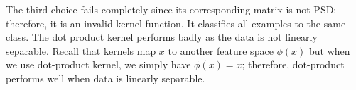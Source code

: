 \begin{answer}
	The third choice fails completely since its corresponding matrix is not PSD; therefore, it is an invalid kernel function.
	It classifies all examples to the same class.
The dot product kernel performs badly as the data is not linearly separable.
Recall that kernels map $x$ to another feature space $\phi(x)$ but when we use dot-product kernel, we simply have $\phi(x)=x$; therefore, dot-product performs well when data is linearly separable.
\end{answer}
